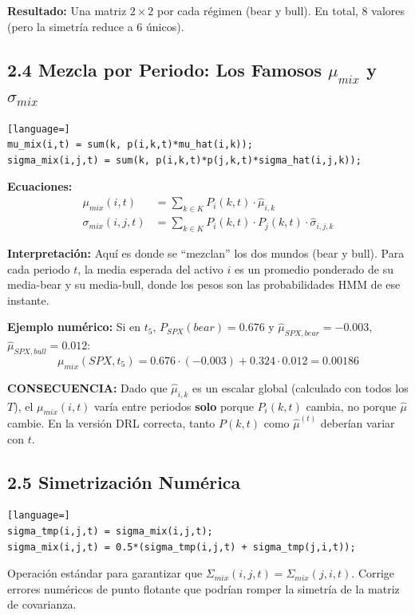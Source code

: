 \documentclass[11pt,a4paper]{article}
\begin{document}
\textbf{Resultado:} Una matriz $2 \times 2$ por cada régimen (bear y bull). En total, 8 valores (pero la simetría reduce a 6 únicos).

\subsection{2.4 Mezcla por Periodo: Los Famosos $\mu_{mix}$ y $\sigma_{mix}$}
\begin{lstlisting}[language=]
mu_mix(i,t) = sum(k, p(i,k,t)*mu_hat(i,k));
sigma_mix(i,j,t) = sum(k, p(i,k,t)*p(j,k,t)*sigma_hat(i,j,k));
\end{lstlisting}

\textbf{Ecuaciones:}
\begin{align}
    \mu_{mix}(i,t) &= \sum_{k \in K} P_i(k,t) \cdot \hat{\mu}_{i,k} \\
    \sigma_{mix}(i,j,t) &= \sum_{k \in K} P_i(k,t) \cdot P_j(k,t) \cdot \hat{\sigma}_{i,j,k}
\end{align}

\textbf{Interpretación:} Aquí es donde se ``mezclan'' los dos mundos (bear y bull). Para cada periodo $t$, la media esperada del activo $i$ es un promedio ponderado de su media-bear y su media-bull, donde los pesos son las probabilidades HMM de ese instante.

\textbf{Ejemplo numérico:} Si en $t_5$, $P_{SPX}(bear) = 0.676$ y $\hat{\mu}_{SPX, bear} = -0.003$, $\hat{\mu}_{SPX, bull} = 0.012$:
$$\mu_{mix}(SPX, t_5) = 0.676 \cdot (-0.003) + 0.324 \cdot 0.012 = 0.00186$$

\colorbox{yellow!30}{\parbox{0.9\textwidth}{
\textbf{CONSECUENCIA:} Dado que $\hat{\mu}_{i,k}$ es un escalar global (calculado con todos los $T$), el $\mu_{mix}(i,t)$ varía entre periodos \textbf{solo} porque $P_i(k,t)$ cambia, no porque $\hat{\mu}$ cambie. En la versión DRL correcta, tanto $P(k,t)$ como $\hat{\mu}^{(t)}$ deberían variar con $t$.
}}

\subsection{2.5 Simetrización Numérica}
\begin{lstlisting}[language=]
sigma_tmp(i,j,t) = sigma_mix(i,j,t);
sigma_mix(i,j,t) = 0.5*(sigma_tmp(i,j,t) + sigma_tmp(j,i,t));
\end{lstlisting}

Operación estándar para garantizar que $\Sigma_{mix}(i,j,t) = \Sigma_{mix}(j,i,t)$. Corrige errores numéricos de punto flotante que podrían romper la simetría de la matriz de covarianza.
\end{document}
